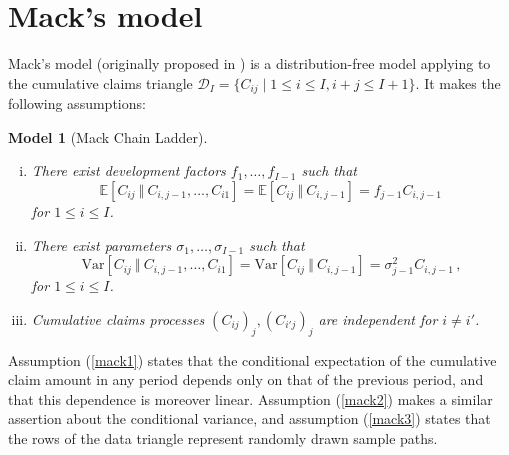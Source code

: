\documentclass[a4paper]{book}
\theoremstyle{plain}
\newtheorem{model}{Model}
\begin{document}
\section{Mack's model}

Mack's model (originally proposed in \cite{mack:chain-ladder}) is a distribution-free model applying to the cumulative claims triangle $\mathcal{D}_I = \{ C_{ij} \mid 1 \leq i \leq I, i + j \leq I + 1 \}$. It makes the following assumptions:
\begin{model}[Mack Chain Ladder] \label{model:mack} \leavevmode
    \begin{enumerate}[(i)]
        \item \label{mack1} There exist development factors $f_1, \dots, f_{I - 1}$ such that
        \begin{equation}
            \mathbb{E}[C_{ij} \ \Vert \ C_{i, j - 1}, \dots, C_{i1}] = \mathbb{E}[C_{ij} \ \Vert \ C_{i, j - 1}] = f_{j - 1} C_{i, j - 1}\,
        \end{equation}
        for $1 \leq i \leq I$.
        \item \label{mack2} There exist parameters $\sigma_1, \dots, \sigma_{I - 1}$ such that
        \begin{equation}
            \mathrm{Var}[C_{ij} \ \Vert \ C_{i, j - 1}, \dots, C_{i1}] = \mathrm{Var}[C_{ij} \ \Vert \ C_{i, j - 1}] = \sigma_{j - 1}^2 C_{i, j - 1}\,,
        \end{equation}
        for $1 \leq i \leq I$.
        \item \label{mack3} Cumulative claims processes $(C_{ij})_j, (C_{i'j})_j$ are independent for $i \neq i'$.
    \end{enumerate}
\end{model}
Assumption (\ref{mack1}) states that the conditional expectation of the cumulative claim amount in any period depends only on that of the previous period, and that this dependence is moreover linear. Assumption (\ref{mack2}) makes a similar assertion about the conditional variance, and assumption (\ref{mack3}) states that the rows of the data triangle represent randomly drawn sample paths.
\end{document}
